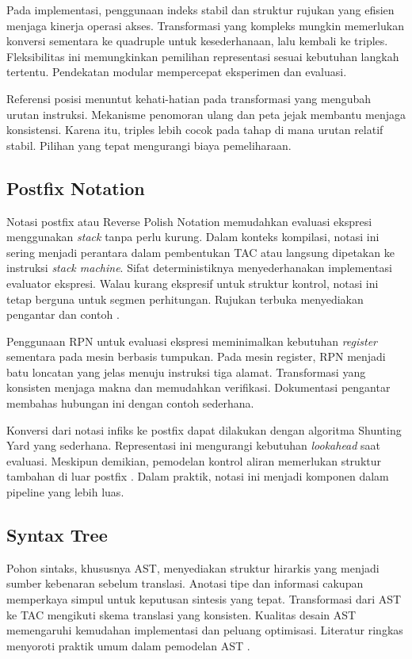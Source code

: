 \documentclass[../main.tex]{subfiles}
\begin{document}
Pada implementasi, penggunaan indeks stabil dan struktur rujukan yang efisien menjaga kinerja operasi akses. Transformasi yang kompleks mungkin memerlukan konversi sementara ke quadruple untuk kesederhanaan, lalu kembali ke triples. Fleksibilitas ini memungkinkan pemilihan representasi sesuai kebutuhan langkah tertentu. Pendekatan modular mempercepat eksperimen dan evaluasi.

Referensi posisi menuntut kehati-hatian pada transformasi yang mengubah urutan instruksi. Mekanisme penomoran ulang dan peta jejak membantu menjaga konsistensi. Karena itu, triples lebih cocok pada tahap di mana urutan relatif stabil. Pilihan yang tepat mengurangi biaya pemeliharaan.

\subsection{Postfix Notation}
Notasi postfix atau Reverse Polish Notation memudahkan evaluasi ekspresi menggunakan \emph{stack} tanpa perlu kurung. Dalam konteks kompilasi, notasi ini sering menjadi perantara dalam pembentukan TAC atau langsung dipetakan ke instruksi \emph{stack machine}. Sifat deterministiknya menyederhanakan implementasi evaluator ekspresi. Walau kurang ekspresif untuk struktur kontrol, notasi ini tetap berguna untuk segmen perhitungan. Rujukan terbuka menyediakan pengantar dan contoh \citep{WikiPostfix}.

Penggunaan RPN untuk evaluasi ekspresi meminimalkan kebutuhan \emph{register} sementara pada mesin berbasis tumpukan. Pada mesin register, RPN menjadi batu loncatan yang jelas menuju instruksi tiga alamat. Transformasi yang konsisten menjaga makna dan memudahkan verifikasi. Dokumentasi pengantar membahas hubungan ini dengan contoh sederhana.

Konversi dari notasi infiks ke postfix dapat dilakukan dengan algoritma Shunting Yard yang sederhana. Representasi ini mengurangi kebutuhan \emph{lookahead} saat evaluasi. Meskipun demikian, pemodelan kontrol aliran memerlukan struktur tambahan di luar postfix \citep{WikiPostfix}. Dalam praktik, notasi ini menjadi komponen dalam pipeline yang lebih luas.

\subsection{Syntax Tree}
Pohon sintaks, khususnya AST, menyediakan struktur hirarkis yang menjadi sumber kebenaran sebelum translasi. Anotasi tipe dan informasi cakupan memperkaya simpul untuk keputusan sintesis yang tepat. Transformasi dari AST ke TAC mengikuti skema translasi yang konsisten. Kualitas desain AST memengaruhi kemudahan implementasi dan peluang optimisasi. Literatur ringkas menyoroti praktik umum dalam pemodelan AST \citep{WikiAST}.
\end{document}
